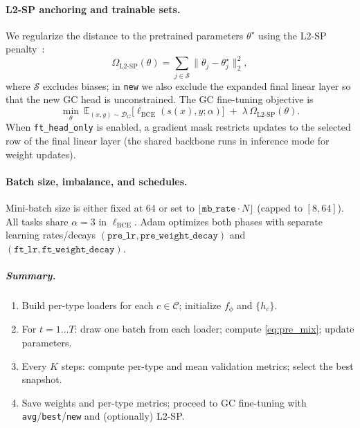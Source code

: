 \documentclass[journal,article,submit,pdftex,moreauthors]{Definitions/mdpi}
\begin{document}
\paragraph{L2-SP anchoring and trainable sets.}
We regularize the distance to the pretrained parameters $\theta^\star$ using the L2-SP penalty~\citep{Li2018_L2SP}:
\begin{equation}
\Omega_{\mathrm{L2\text{-}SP}}(\theta)=\sum_{j\in\mathcal{S}}\|\theta_j-\theta^\star_j\|_2^2,
\end{equation}
where $\mathcal{S}$ excludes biases; in \texttt{new} we also exclude the expanded final linear layer so that the new GC head is unconstrained. The GC fine-tuning objective is
\begin{equation}
\label{eq:ft_obj}
\min_{\theta}\ \mathbb{E}_{(x,y)\sim \mathcal{D}_G}\!\big[\ell_{\mathrm{BCE}}(s(x),y;\alpha)\big]\;+\;\lambda\,\Omega_{\mathrm{L2\text{-}SP}}(\theta).
\end{equation}
When \texttt{ft\_head\_only} is enabled, a gradient mask restricts updates to the selected row of the final linear layer (the shared backbone runs in inference mode for weight updates).

\paragraph{Batch size, imbalance, and schedules.}
Mini-batch size is either fixed at $64$ or set to $\lfloor \texttt{mb\_rate}\cdot N\rfloor$ (capped to $[8,64]$). All tasks share $\alpha{=}3$ in $\ell_{\mathrm{BCE}}$. Adam optimizes both phases with separate learning rates/decays $(\texttt{pre\_lr},\texttt{pre\_weight\_decay})$ and $(\texttt{ft\_lr},\texttt{ft\_weight\_decay})$.

\subparagraph{Summary.}
\begin{enumerate}[topsep=0pt,itemsep=1pt,leftmargin=12pt]
\item Build per-type loaders for each $c\in\mathcal{C}$; initialize $f_\phi$ and $\{h_c\}$.
\item For $t=1\ldots T$: draw one batch from each loader; compute \eqref{eq:pre_mix}; update parameters.
\item Every $K$ steps: compute per-type and mean validation metrics; select the best snapshot.
\item Save weights and per-type metrics; proceed to GC fine-tuning with \texttt{avg}/\texttt{best}/\texttt{new} and (optionally) L2-SP.
\end{enumerate}
\end{document}
